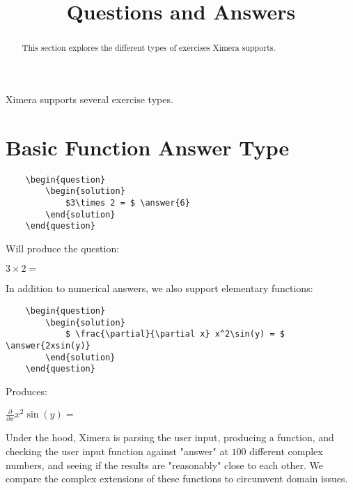 \documentclass{ximera}
\title{Questions and Answers}
\begin{document}
	\begin{abstract}
		This section explores the different types of exercises Ximera supports. 
	\end{abstract}

\maketitle
	
Ximera supports several exercise types.
	
	
\section{Basic Function Answer Type}	
\begin{verbatim}
    \begin{question}
        \begin{solution}
            $3\times 2 = $ \answer{6}
        \end{solution}
    \end{question}
\end{verbatim}

Will produce the question:

\begin{question}
        \begin{solution}
            $3\times 2 = $ 
        \end{solution}
\end{question}

In addition to numerical answers, we also support elementary functions:

\begin{verbatim}
    \begin{question}
        \begin{solution}
            $ \frac{\partial}{\partial x} x^2\sin(y) = $ \answer{2xsin(y)}
        \end{solution}
    \end{question}
\end{verbatim}

Produces:

  \begin{question}
        \begin{solution}
            $ \frac{\partial}{\partial x} x^2\sin(y) = $ 
        \end{solution}
    \end{question}
    
Under the hood, Ximera is parsing the user input, producing a function, and checking the user input function against "answer" at 
$100$ different complex numbers, and seeing if the results are "reasonably" close to each other.  
We compare the complex extensions of these functions to circumvent domain issues.
\end{document}
